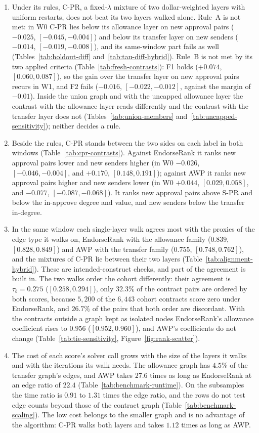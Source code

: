 \begin{enumerate}
\item[C3.] Under its rules, \mbox{C-PR}, a fixed-$\lambda$ mixture of two dollar-weighted layers with uniform restarts, does not beat its two layers walked alone. Rule~A is not met: in W0 \mbox{C-PR} lies below its allowance layer on new approval pairs ($-0.025$, $[-0.045,-0.004]$) and below its transfer layer on new senders ($-0.014$, $[-0.019,-0.008]$), and its same-window part fails as well (Tables~\ref{tab:holdout-diff} and~\ref{tab:tau-diff-hybrid}). Rule~B is not met by its two applied criteria (Table~\ref{tab:fresh-contrasts}): F1 holds ($+0.074$, $[0.060,0.087]$), so the gain over the transfer layer on new approval pairs recurs in W1, and F2 fails ($-0.016$, $[-0.022,-0.012]$, against the margin of $-0.01$). Inside the union graph and with the uncapped allowance layer the contrast with the allowance layer reads differently and the contrast with the transfer layer does not (Tables~\ref{tab:union-members} and~\ref{tab:uncapped-sensitivity}); neither decides a rule.
\item[C4.] Beside the rules, \mbox{C-PR} stands between the two sides on each label in both windows (Table~\ref{tab:cpr-contrasts}). Against EndorseRank it ranks new approval pairs lower and new senders higher (in W0 $-0.026$, $[-0.046,-0.004]$, and $+0.170$, $[0.148,0.191]$); against AWP it ranks new approval pairs higher and new senders lower (in W0 $+0.044$, $[0.029,0.058]$, and $-0.077$, $[-0.087,-0.068]$). It ranks new approval pairs above \mbox{S-PR} and below the in-approve degree and value, and new senders below the transfer in-degree.
\item[C5.] In the same window each single-layer walk agrees most with the proxies of the edge type it walks on, EndorseRank with the allowance family ($0.839$, $[0.828,0.849]$) and AWP with the transfer family ($0.755$, $[0.748,0.762]$), and the mixtures of \mbox{C-PR} lie between their two layers (Table~\ref{tab:alignment-hybrid}). These are intended-construct checks, and part of the agreement is built in. The two walks order the cohort differently: their agreement is $\tau_b=0.275$ ($[0.258,0.294]$), only $32.3\%$ of the contract pairs are ordered by both scores, because $5{,}200$ of the $6{,}443$ cohort contracts score zero under EndorseRank, and $26.7\%$ of the pairs that both order are discordant. With the contracts outside a graph kept as isolated nodes EndorseRank's allowance coefficient rises to $0.956$ ($[0.952,0.960]$), and AWP's coefficients do not change (Table~\ref{tab:tie-sensitivity}, Figure~\ref{fig:rank-scatter}).
\item[C6.] The cost of each score's solver call grows with the size of the layers it walks and with the iterations its walk needs. The allowance graph has $4.5\%$ of the transfer graph's edges, and AWP takes $27.6$ times as long as EndorseRank at an edge ratio of $22.4$ (Table~\ref{tab:benchmark-runtime}). On the subsamples the time ratio is $0.91$ to $1.31$ times the edge ratio, and the rows do not test edge counts beyond those of the contract graph (Table~\ref{tab:benchmark-scaling}). The low cost belongs to the smaller graph and is no advantage of the algorithm: \mbox{C-PR} walks both layers and takes $1.12$ times as long as AWP.
\end{enumerate}
